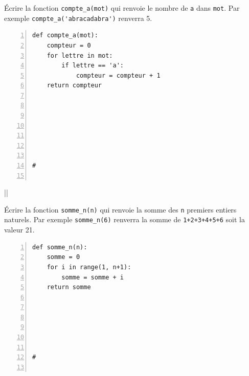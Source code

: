 \documentclass[a4paper,12pt,openany]{book}
\begin{document}
	
	
	
	
\exo

\begin{minipage}{8.5cm}
Écrire la fonction \verb+compte_a(mot)+ qui renvoie le nombre de \verb+a+ dans \verb+mot+. Par exemple \verb+compte_a('abracadabra')+ renverra 5.

\begin{lstlisting}[numbers=left]
def compte_a(mot):
	compteur = 0
	for lettre in mot:
		if lettre == 'a':
			compteur = compteur + 1
	return compteur







#
		
\end{lstlisting}
\end{minipage}
\begin{minipage}{1cm}
||
\end{minipage}
\begin{minipage}{8.5cm}
Écrire la fonction \verb+somme_n(n)+ qui renvoie la somme des \verb+n+ premiers entiers naturels. Par exemple \verb+somme_n(6)+ renverra la somme de \verb-1+2+3+4+5+6- soit la valeur 21.

\begin{lstlisting}[numbers=left]
def somme_n(n):
	somme = 0
	for i in range(1, n+1):
		somme = somme + i
	return somme






#
		
\end{lstlisting}
\end{minipage}
\newpage
\end{document}
